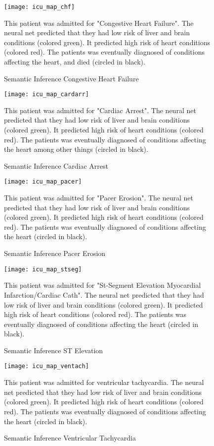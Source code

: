 \begin{figure}
\texttt{[image: icu\_map\_chf]}
\caption{Semantic Inference Congestive Heart Failure}
\vspace{12px}
This patient was admitted for "Congestive Heart Failure".  The neural net predicted that they had low risk of liver and brain conditions (colored green).  It predicted high risk of heart conditions (colored red).  The patients was eventually diagnosed of conditions affecting the heart, and died (circled in black).
\label{fig:icu_map_chf}
\end{figure}

\begin{figure}
\texttt{[image: icu\_map\_cardarr]}
\caption{Semantic Inference Cardiac Arrest}
\vspace{12px}
This patient was admitted for "Cardiac Arrest".  The neural net predicted that they had low risk of liver and brain conditions (colored green).  It predicted high risk of heart conditions (colored red).  The patients was eventually diagnosed of conditions affecting the heart among other things (circled in black).
\label{fig:icu_map_cardarr}
\end{figure}

\begin{figure}
\texttt{[image: icu\_map\_pacer]}
\caption{Semantic Inference Pacer Erosion}
\vspace{12px}
This patient was admitted for "Pacer Erosion".  The neural net predicted that they had low risk of liver and brain conditions (colored green).  It predicted high risk of heart conditions (colored red).  The patients was eventually diagnosed of conditions affecting the heart (circled in black).
\label{fig:icu_map_pacer}
\end{figure}

\begin{figure}
\texttt{[image: icu\_map\_stseg]}
\caption{Semantic Inference ST Elevation}
\vspace{12px}
This patient was admitted for "St-Segment Elevation Myocardial Infarction/Cardiac Cath".  The neural net predicted that they had low risk of liver and brain conditions (colored green).  It predicted high risk of heart conditions (colored red).  The patients was eventually diagnosed of conditions affecting the heart (circled in black).
\label{fig:icu_map_stseg}
\end{figure}

\begin{figure}
\texttt{[image: icu\_map\_ventach]}
\caption{Semantic Inference Ventricular Tachycardia}
\vspace{12px}
This patient was admitted for ventricular tachycardia.  The neural net predicted that they had low risk of liver and brain conditions (colored green).  It predicted high risk of heart conditions (colored red).  The patients was eventually diagnosed of conditions affecting the heart (circled in black).
\label{fig:icu_map_ventach}
\end{figure}


